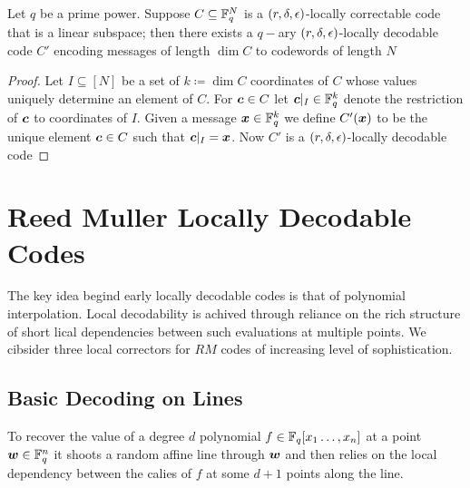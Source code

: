\begin{lemma}
	Let $q$ be a prime power. Suppose $C\subseteq \mathbb{F}_q^N$ is a $(r,\delta, \epsilon)$-locally correctable code that is a linear subspace; then there exists a $q-$ary $(r,\delta,\epsilon)$-locally decodable code $C'$ encoding messages of length $\dim C$ to codewords of length $N$
\end{lemma}
\begin{proof}
	Let $I\subseteq [N]$ be a set of $k\coloneqq \dim C$ coordinates of $C$ whose values uniquely determine an element of $C$. For $\boldsymbol{c}\in C$ let $\boldsymbol{c}|_I\in \mathbb{F}_q^k$ denote the restriction of $\boldsymbol{c}$ to coordinates of $I$. Given a message $\boldsymbol{x}\in \mathbb{F}_q^k$ we define $C'(\boldsymbol{x})$ to be the unique element $\boldsymbol{c}\in C$ such that $\boldsymbol{c}|_I=\boldsymbol{x}$. Now $C'$ is a $(r,\delta,\epsilon)$-locally decodable code
\end{proof}

\section{Reed Muller Locally Decodable Codes}
The key idea begind early locally decodable codes is that of polynomial interpolation. Local decodability is achived through reliance on the rich structure of short lical dependencies between such evaluations at multiple points. We cibsider three local correctors for $RM$ codes of increasing level of sophistication. 
\subsection{Basic Decoding on Lines}
To recover the value of a degree $d$ polynomial $f\in \mathbb{F}_q[x_1\dots, x_n]$ at a point $\boldsymbol{w}\in \mathbb{F}_q^n$ it shoots a random affine line through $\boldsymbol{w}$ and then relies on the local dependency between the calies of $f$ at some $d+1$ points along the line.